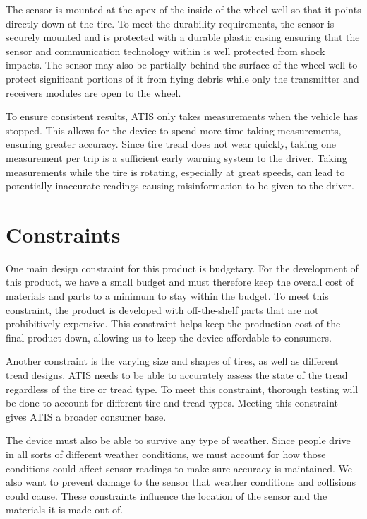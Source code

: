 \documentclass[11pt]{IEEEtran}
\begin{document}
			The sensor is mounted at the apex of the inside of the wheel well so that it points directly down at the tire. To meet the durability requirements, the sensor is securely mounted and is protected with a durable plastic casing ensuring that the sensor and communication technology within is well protected from shock impacts. The sensor may also be partially behind the surface of the wheel well to protect significant portions of it from flying debris while only the transmitter and receivers modules are open to the wheel.

			To ensure consistent results, ATIS only takes measurements when the vehicle has stopped. This allows for the device to spend more time taking measurements, ensuring greater accuracy. Since tire tread does not wear quickly, taking one measurement per trip is a sufficient early warning system to the driver. Taking measurements while the tire is rotating, especially at great speeds, can lead to potentially inaccurate readings causing misinformation to be given to the driver.


	\section{Constraints}
		One main design constraint for this product is budgetary. For the development of this product, we have a small budget and must therefore keep the overall cost of materials and parts to a minimum to stay within the budget. To meet this constraint, the product is developed with off-the-shelf parts that are not prohibitively expensive. This constraint helps keep the production cost of the final product down, allowing us to keep the device affordable to consumers. 

		Another constraint is the varying size and shapes of tires, as well as different tread designs. ATIS needs to be able to accurately assess the state of the tread regardless of the tire or tread type. To meet this constraint, thorough testing will be done to account for different tire and tread types. Meeting this constraint gives ATIS a broader consumer base.

		The device must also be able to survive any type of weather. Since people drive in all sorts of different weather conditions, we must account for how those conditions could affect sensor readings to make sure accuracy is maintained. We also want to prevent damage to the sensor that weather conditions and collisions could cause. These constraints influence the location of the sensor and the materials it is made out of.
\end{document}
